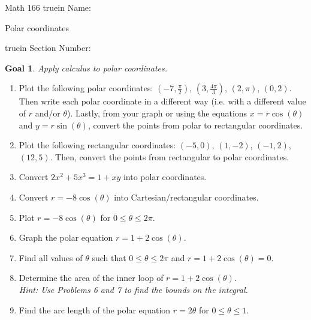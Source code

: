 \documentclass[12pt]{article}
\newtheorem*{goal}{Goal}
\begin{document}
\pagestyle{empty} %

\noindent
{Math 166  truein  Name:\ \hrulefill}

\noindent
{Polar coordinates}

\noindent  {} truein  Section Number:\ \hrulefill
\medskip

\begin{goal} \rm
Apply calculus to polar coordinates.
\end{goal}

\begin{enumerate}
\item  Plot the following polar coordinates:  $(-7, \frac{\pi}{2})$, $(3, \frac{4\pi}{3})$, $(2, \pi)$, $(0, 2)$. Then write
each polar coordinate in a different way (i.e. with a different value of $r$ and/or $\theta$).
Lastly, from your graph or using the equations $x = r \cos(\theta)$ and $y = r \sin (\theta)$, convert the points from polar to rectangular coordinates.
\vfill
\item Plot the following rectangular coordinates: $(-5, 0)$, $(1, -2)$, $(-1, 2)$, $(12, 5)$. 
Then, convert the points from rectangular to polar coordinates. 
\vfill
\pagebreak
\item Convert $2x^2+5x^3=1+xy$ into polar coordinates. 
\vfill
\item   Convert $r = -8\cos(\theta)$ into Cartesian/rectangular coordinates.
\vfill
\item  Plot $r = -8\cos(\theta)$ for $0\leq \theta \leq 2\pi$.
\vfill
\pagebreak
\item Graph the polar equation $r = 1+2 \cos(\theta)$.
\vfill
\item Find all values of $\theta$ such that $0\leq \theta\leq 2\pi$ and $r = 1+2 \cos(\theta) = 0$.
\vfill
\pagebreak
\item  Determine the area of the inner loop of 
$r=1+2 \cos(\theta)$.
\\
\textit{Hint: Use Problems 6 and 7 to find the bounds on the integral.}
\vfill
\item  Find the arc length of the polar equation $r = 2\theta$ for $0 \leq \theta \leq 1$.
\vfill
\end{enumerate} 
\end{document}
